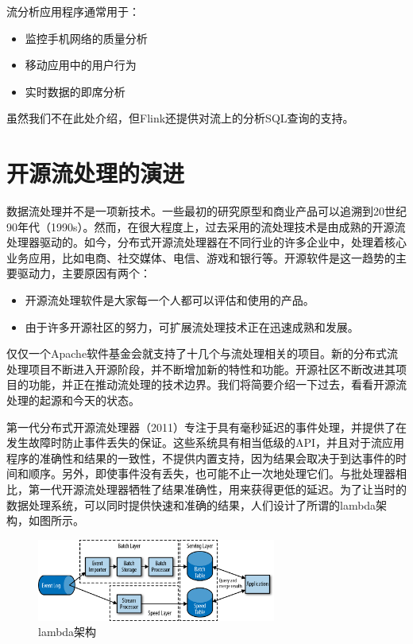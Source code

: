 \documentclass[cn,11pt,chinese]{elegantbook}
\begin{document}
流分析应用程序通常用于：

\begin{itemize}
    \item 监控手机网络的质量分析
    \item 移动应用中的用户行为
    \item 实时数据的即席分析
\end{itemize}

虽然我们不在此处介绍，但Flink还提供对流上的分析SQL查询的支持。

\section{开源流处理的演进}

数据流处理并不是一项新技术。一些最初的研究原型和商业产品可以追溯到20世纪90年代（1990s）。然而，在很大程度上，过去采用的流处理技术是由成熟的开源流处理器驱动的。如今，分布式开源流处理器在不同行业的许多企业中，处理着核心业务应用，比如电商、社交媒体、电信、游戏和银行等。开源软件是这一趋势的主要驱动力，主要原因有两个：

\begin{itemize}
    \item 开源流处理软件是大家每一个人都可以评估和使用的产品。
    \item 由于许多开源社区的努力，可扩展流处理技术正在迅速成熟和发展。
\end{itemize}

仅仅一个Apache软件基金会就支持了十几个与流处理相关的项目。新的分布式流处理项目不断进入开源阶段，并不断增加新的特性和功能。开源社区不断改进其项目的功能，并正在推动流处理的技术边界。我们将简要介绍一下过去，看看开源流处理的起源和今天的状态。

第一代分布式开源流处理器（2011）专注于具有毫秒延迟的事件处理，并提供了在发生故障时防止事件丢失的保证。这些系统具有相当低级的API，并且对于流应用程序的准确性和结果的一致性，不提供内置支持，因为结果会取决于到达事件的时间和顺序。另外，即使事件没有丢失，也可能不止一次地处理它们。与批处理器相比，第一代开源流处理器牺牲了结果准确性，用来获得更低的延迟。为了让当时的数据处理系统，可以同时提供快速和准确的结果，人们设计了所谓的lambda架构，如图所示。

\begin{figure}[htbp]
  \centering
  \includegraphics[width=0.7\textwidth]{images/spaf_0107.png}
  \caption{lambda架构}
\end{figure}
\end{document}
